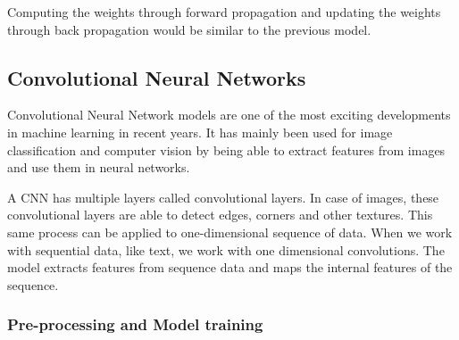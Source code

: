 Computing the weights through forward propagation and updating the weights through back propagation would be similar to the previous model.

\subsection{Convolutional Neural Networks}

Convolutional Neural Network models are one of the most exciting developments in machine learning in recent years. It has mainly been used for image classification and computer vision by being able to extract features from images and use them in neural networks.

A CNN has multiple layers called convolutional layers. In case of images, these convolutional layers are able to detect edges, corners and other textures. This same process can be applied to one-dimensional sequence of data. When we work with sequential data, like text, we work with one dimensional convolutions. The model extracts features from sequence data and maps the internal features of the sequence.

\subsubsection{Pre-processing and Model training}

